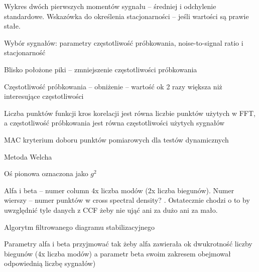 Wykres dwóch pierwszych momentów sygnału – średniej i odchylenie standardowe. Wskazówka do określenia stacjonarności – jeśli wartości są prawie stałe. \parencite{caicedo_practical_2011,bendat_random_2011}


Wybór sygnałów: parametry częstotliwość próbkowania, noise-to-signal ratio i stacjonarność


Blisko położone piki – zmniejszenie częstotliwości próbkowania \parencite{caicedo_practical_2011}


Częstotliwość próbkowania – obniżenie – wartość ok 2 razy większa niż interesujące częstotliwości \parencite{caicedo_practical_2011}


Liczba punktów funkcji kros korelacji jest równa liczbie punktów użytych w FFT, a częstotliwość próbkowania jest równa częstotliwości użytych sygnałów \parencite{caicedo_practical_2011}

MAC kryterium doboru punktów pomiarowych dla testów dynamicznych 


Metoda Welcha \parencite{welch_use_1967}


Oś pionowa oznaczona jako $g^2$ \parencite{caicedo_practical_2011}

Alfa i beta – numer column 4x liczba modów (2x liczba biegunów). Numer wierszy – numer punktów w cross spectral density? \parencite{caicedo_practical_2011}. Ostatecznie chodzi o to by uwzględnić tyle danych z CCF żeby nie ująć ani za dużo ani za mało.


Algorytm filtrowanego diagramu stabilizacyjnego  \parencite{caicedo_practical_2011}

Parametry alfa i beta \parencite{brownjohn_ambient_2010,caicedo_practical_2011,hollkamp_modal_2001,nayeri_study_2009,siringoringo_system_2008,szafranski_oddzialywania_2013}  przyjmować tak żeby alfa zawierała ok dwukrotność liczby biegunów (4x liczba modów) a parametr beta swoim zakresem obejmował odpowiednią liczbę sygnałów)


\printbibliography


